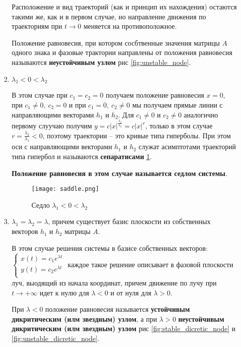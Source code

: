 \begin{enumerate}
\begin{enumerate}
    Расположение и вид траекторий (как и принцип их нахождения) остаются такими же, как и в первом случае, но направление движения по траекториям при $t \rightarrow 0$ меняется на противоположное.

    \begin{definition}
      Положение равновесия, при котором сосбтвенные значения матрицы $A$ одного знака и фазовые трактории направлены от положения равновесия называются \textbf{неустойчивым узлом} рис \ref{fig:unstable_node}.
    \end{definition}

    \item $\lambda_1 < 0 < \lambda_2$
    
    В этом случае при $c_1 = c_2 = 0$ получаем положение равновесия $x = 0$, при $c_1 \neq 0, ~ c_2 = 0$ и при $c_1 = 0, ~ c_2 \neq 0$ мы получаем прямые линии с направляющими векторами $h_1$ и $h_2$. Для $c_1 \neq 0$ и $c_2 \neq 0$ аналогично первому слуучаю получим $\displaystyle y = c |x|^{\frac{\lambda_2}{\lambda_2}} = c |x|^r$, только в этом случае $\displaystyle r = \frac{\lambda_2}{\lambda_1} < 0$, поэтому траектории -- это кривые типа гиперболы. При этом оси с направляющими векторами $h_1$ и $h_2$ служат асимптотами траекторий типа гипербол и называются \textbf{сепаратисами} \ref{fig:saddle}.

    \textbf{Положение равновесия в этом случае называется седлом системы}.

    \begin{figure}[h!]
      \centering
      \texttt{[image: saddle.png]}
      \caption{Седло $\lambda_1 < 0 < \lambda_2$}
      \label{fig:saddle}
    \end{figure}

    \item $\lambda_1 = \lambda_2 = \lambda$, причем существует базис плоскости из собственных векторов $h_1$ и $h_2$ матрицы $A$.
    
    В этом случае решения системы в базисе собственных векторов:
    $\begin{cases}
      x(t) = c_1 e^{\lambda t} \\
      y(t) = c_2 e^{\lambda t} \\
    \end{cases}$
    каждое такое решение описывает в фазовой плоскости луч, выодящий из начала координат, причем движение по лучу при $t \rightarrow + \infty$ идет к нулю для $\lambda < 0$ и от нуля для $\lambda > 0$.

    При $\lambda < 0$ положение равновесия называется \textbf{устойчивым дикритическим (илм звездным) узлом}, а при $\lambda > 0$ \textbf{неустойчивым дикритическим (илм звездным) узлом} рис \ref{fig:stable_dicretic_node} и \ref{fig:unstable_dicretic_node}.


\end{enumerate}
\end{enumerate}

